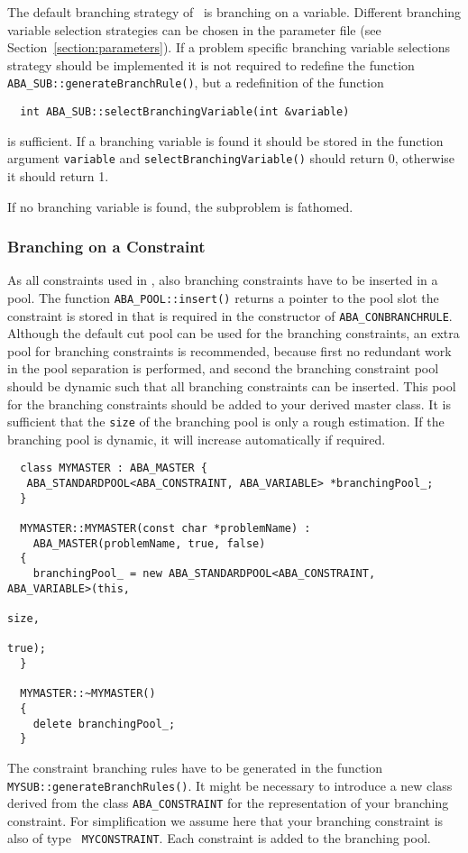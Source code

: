 The default branching strategy of \ABACUS\ is branching on a variable.
Different branching variable selection
strategies can be chosen in the parameter
file (see Section~\ref{section:parameters}). If a problem specific
branching variable selections strategy should be implemented it is
not required to redefine the function {\tt ABA\_SUB::generateBranchRule()},
but a redefinition of the function 
\begin{verbatim}
  int ABA_SUB::selectBranchingVariable(int &variable)
\end{verbatim}
is sufficient. If a branching variable is found it should be stored
in the function argument {\tt variable} and 
{\tt selectBranchingVariable()} should return 0, otherwise it should
return 1. 

If no branching variable is found, the subproblem is fathomed.

\subsubsection{Branching on a Constraint}

As all constraints used in \ABACUS, also branching constraints have
to be inserted in a pool. The function {\tt ABA\_POOL::insert()} returns
a pointer to the pool slot the constraint is stored in that is
required in the constructor of 
{\tt ABA\_CONBRANCHRULE}. Although the
default cut pool can be used for the branching constraints, an extra
pool for branching constraints is recommended, because first no
redundant work in the pool separation is performed, and second
the branching constraint pool should be dynamic such that all 
branching constraints can be inserted. This pool for the branching
constraints should be added to your derived master class.
It is sufficient that the {\tt size} of the branching pool is only a
rough estimation. If the branching pool is dynamic, it will increase
automatically if required.
\begin{verbatim}
  class MYMASTER : ABA_MASTER {
   ABA_STANDARDPOOL<ABA_CONSTRAINT, ABA_VARIABLE> *branchingPool_;
  }

  MYMASTER::MYMASTER(const char *problemName) :
    ABA_MASTER(problemName, true, false)
  {
    branchingPool_ = new ABA_STANDARDPOOL<ABA_CONSTRAINT, ABA_VARIABLE>(this, 
                                                                        size, 
                                                                        true);
  }

  MYMASTER::~MYMASTER()
  {
    delete branchingPool_;
  }
\end{verbatim}
The constraint branching rules have to be generated in the function
{\tt MYSUB::generateBranchRules()}. It might be necessary to introduce
a new class derived from the class {\tt ABA\_CONSTRAINT} for the
representation of your branching constraint. For simplification we
assume here that your branching constraint is also of type {\tt
  MYCONSTRAINT}. Each constraint is added to the branching pool.

